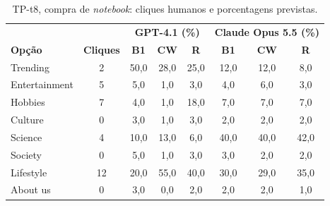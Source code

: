 \documentclass[12pt,oneside,a4paper,chapter=TITLE,english,brazil]{abntex2}
\begin{document}
\begin{apendicesenv}
\begin{table}[htb]
\centering
\caption{TP-t8, compra de \textit{notebook}: cliques humanos e porcentagens previstas.}
\label{tab:distnotebook}
\footnotesize
\begin{tabular}{@{}lccccccc@{}}
\toprule
 & & \multicolumn{3}{c}{\textbf{GPT-4.1 (\%)}} & \multicolumn{3}{c}{\textbf{Claude Opus 5.5 (\%)}} \\
\textbf{Opção} & \textbf{Cliques} & \textbf{B1} & \textbf{CW} & \textbf{R} & \textbf{B1} & \textbf{CW} & \textbf{R} \\
\midrule
Trending & 2 & 50,0 & 28,0 & 25,0 & 12,0 & 12,0 & 8,0 \\
Entertainment & 5 & 5,0 & 1,0 & 3,0 & 4,0 & 6,0 & 3,0 \\
Hobbies & 7 & 4,0 & 1,0 & 18,0 & 7,0 & 7,0 & 7,0 \\
Culture & 0 & 3,0 & 1,0 & 3,0 & 2,0 & 2,0 & 2,0 \\
Science & 4 & 10,0 & 13,0 & 6,0 & 40,0 & 40,0 & 42,0 \\
Society & 0 & 5,0 & 1,0 & 3,0 & 3,0 & 2,0 & 2,0 \\
Lifestyle & 12 & 20,0 & 55,0 & 40,0 & 30,0 & 29,0 & 35,0 \\
About us & 0 & 3,0 & 0,0 & 2,0 & 2,0 & 2,0 & 1,0 \\
\bottomrule
\end{tabular}
\end{table}

\end{apendicesenv}
\end{document}
